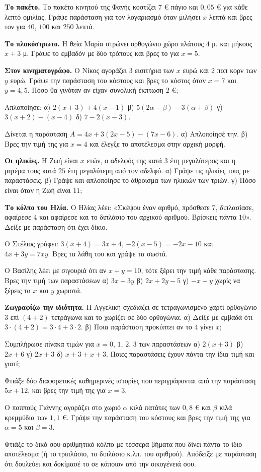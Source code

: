 \ex \textbf{Το πακέτο.} Το πακέτο κινητού της Φανής κοστίζει $7$ € πάγιο και $0{,}05$ € για κάθε λεπτό ομιλίας. Γράψε παράσταση για τον λογαριασμό όταν μιλήσει $x$ λεπτά και βρες τον για $40$, $100$ και $250$ λεπτά.

\ex \textbf{Το πλακόστρωτο.} Η θεία Μαρία στρώνει ορθογώνιο χώρο πλάτους $4$ μ. και μήκους $x+3$ μ. Γράψε το εμβαδόν με δύο τρόπους και βρες το για $x=5$.

\ex \textbf{Στον κινηματογράφο.} Ο Νίκος αγοράζει $3$ εισιτήρια των $x$ ευρώ και $2$ ποπ κορν των $y$ ευρώ. Γράψε την παράσταση του κόστους και βρες το κόστος όταν $x=7$ και $y=4{,}5$. Πόσο θα γινόταν αν είχαν συνολική έκπτωση $2$ €;

\ex Απλοποίησε: α) $2(x+3)+4(x-1)$ \quad β) $5(2\alpha-\beta)-3(\alpha+\beta)$ \quad γ) $3(x+2)-(x-4)$ \quad δ) $7-2(x-3)$.

\ex Δίνεται η παράσταση $A=4x+3(2x-5)-(7x-6)$. α) Απλοποίησέ την. β) Βρες την τιμή της για $x=4$ και έλεγξε το αποτέλεσμα στην αρχική μορφή.

\ex \textbf{Οι ηλικίες.} Η Ζωή είναι $x$ ετών, ο αδελφός της κατά $3$ έτη μεγαλύτερος και η μητέρα τους κατά $25$ έτη μεγαλύτερη από τον αδελφό. α) Γράψε τις ηλικίες τους με παραστάσεις. β) Γράψε και απλοποίησε το άθροισμα των ηλικιών των τριών. γ) Πόσο είναι όταν η Ζωή είναι $11$;


\ex \textbf{Το κόλπο του Ηλία.} Ο Ηλίας λέει: «Σκέψου έναν αριθμό, πρόσθεσε $7$, διπλασίασε, αφαίρεσε $4$ και αφαίρεσε και το διπλάσιο του αρχικού αριθμού. Βρίσκεις πάντα $10$». Δείξε με παράσταση ότι έχει δίκιο.

\ex Ο Στέλιος γράφει: $3(x+4)=3x+4$, $-2(x-5)=-2x-10$ και $4x+3y=7xy$. Βρες τα λάθη του και γράψε τα σωστά.

\ex Ο Βασίλης λέει με σιγουριά ότι αν $x+y=10$, τότε ξέρει την τιμή κάθε παράστασης. Βρες την τιμή των παραστάσεων α) $3x+3y$ \quad β) $2x+2y-5$ \quad γ) $-x-y$ χωρίς να ξέρεις τα $x$ και $y$ χωριστά.

\ex \textbf{Ζωγραφίζω την ιδιότητα.} Η Αγγελική σχεδιάζει σε τετραγωνισμένο χαρτί ορθογώνιο $3$ επί $(4+2)$ τετράγωνα και το χωρίζει σε δύο ορθογώνια. α) Δείξε με εμβαδά ότι $3\cdot(4+2)=3\cdot4+3\cdot2$. β) Ποια παράσταση προκύπτει αν το $4$ γίνει $x$;

\ex Συμπλήρωσε πίνακα τιμών για $x=0,\,1,\,2,\,3$ των παραστάσεων α) $2(x+3)$ \quad β) $2x+6$ \quad γ) $2x+3$ \quad δ) $x+3+x+3$. Ποιες παραστάσεις έχουν πάντα την ίδια τιμή και γιατί;


\ex Φτιάξε δύο διαφορετικές καθημερινές ιστορίες που περιγράφονται από την παράσταση $5x+12$, και βρες την τιμή της για $x=3$.

\ex Ο παππούς Γιάννης αγοράζει στο χωριό $\alpha$ κιλά πατάτες των $0{,}8$ € και $\beta$ κιλά κρεμμύδια των $1{,}1$ €. Γράψε την παράσταση του κόστους και βρες την τιμή της για $\alpha=5$ και $\beta=3$.

\ex Φτιάξε το δικό σου αριθμητικό κόλπο με τέσσερα βήματα που δίνει πάντα το ίδιο αποτέλεσμα (ή το τριπλάσιο, το διπλάσιο κ.λπ. του αριθμού). Απόδειξε με παράσταση ότι δουλεύει και δοκίμασέ το σε κάποιον από την οικογένειά σου.
